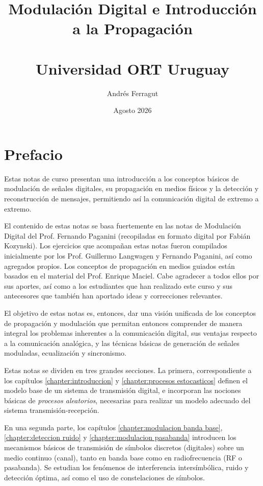 \documentclass[a4paper,11pt]{report}
\theoremstyle{definition}
\begin{document}
\title{\Huge Modulación Digital e Introducción a la Propagación \\ \, \\ \LARGE Universidad ORT Uruguay }
\author{\LARGE Andrés Ferragut}
\date{\LARGE Agosto 2026} 

\maketitle


\chapter*{Prefacio}
\thispagestyle{empty}

Estas notas de curso presentan una introducción a los conceptos básicos de modulación de señales digitales, su propagación en medios físicos y la detección y reconstrucción de mensajes, permitiendo así la comunicación digital de extremo a extremo.

El contenido de estas notas se basa fuertemente en las notas de Modulación Digital del Prof. Fernando Paganini (recopiladas en formato digital por Fabián Kozynski). Los ejercicios que acompañan estas notas fueron compilados inicialmente por los Prof. Guillermo Langwagen y Fernando Paganini, así como agregados propios. Los conceptos de propagación en medios guiados están basados en el material del Prof. Enrique Maciel. Cabe agradecer a todos ellos por sus aportes, así como a los estudiantes que han realizado este curso y sus antecesores que también han aportado ideas y correcciones relevantes.

El objetivo de estas notas es, entonces, dar una visión unificada de los conceptos de propagación y modulación que permitan entonces comprender de manera integral los problemas inherentes a la comunicación digital, sus ventajas respecto a la comunicación analógica, y las técnicas básicas de generación de señales moduladas, ecualización y sincronismo.

Estas notas se dividen en tres grandes secciones. La primera, correspondiente a los capítulos \ref{chapter:introduccion} y \ref{chapter:procesos estocasticos} definen el modelo base de un sistema de transmisión digital, e incorporan las nociones básicas de \emph{procesos aleatorios}, necesarias para realizar un modelo adecuado del sistema transmisión-recepción. 

En una segunda parte, los capítulos \ref{chapter:modulacion banda base}, \ref{chapter:deteccion ruido} y \ref{chapter:modulacion pasabanda} introducen los mecanismos básicos de transmisión de símbolos discretos (digitales) sobre un medio continuo (canal), tanto en banda base como en radiofrecuencia (RF o pasabanda). Se estudian los fenómenos de interferencia intersímbólica, ruido y detección óptima, así como el uso de constelaciones de símbolos.
\end{document}
